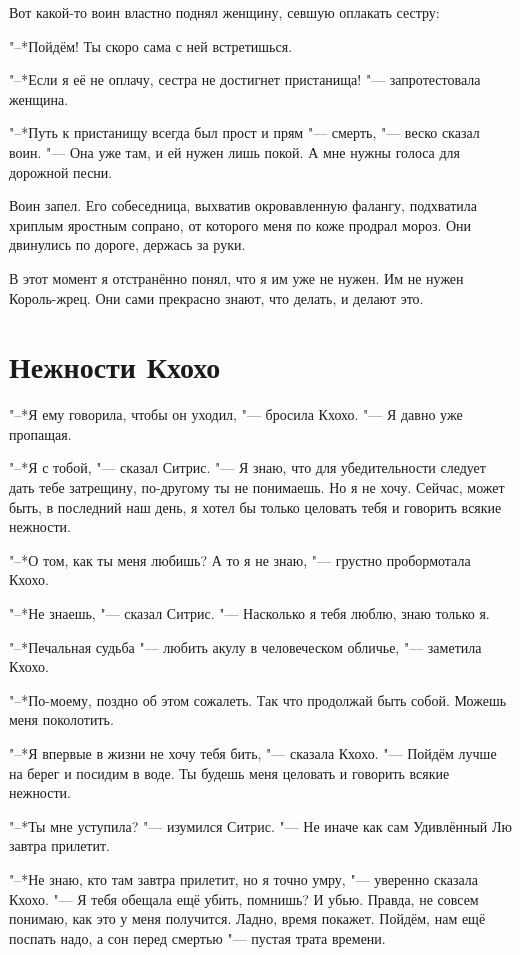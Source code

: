 \documentclass[a4paper,10pt,fleqn]{book}
\begin{document}
Вот какой-то воин властно поднял женщину, севшую оплакать сестру:

"--*Пойдём!
Ты скоро сама с ней встретишься.

"--*Если я её не оплачу, сестра не достигнет пристанища! "--- запротестовала женщина.

"--*Путь к пристанищу всегда был прост и прям "--- смерть, "--- веско сказал воин.
"--- Она уже там, и ей нужен лишь покой.
А мне нужны голоса для дорожной песни.

Воин запел.
Его собеседница, выхватив окровавленную фалангу, подхватила хриплым яростным сопрано, от которого меня по коже продрал мороз.
Они двинулись по дороге, держась за руки.

В этот момент я отстранённо понял, что я им уже не нужен.
Им не нужен Король-жрец.
Они сами прекрасно знают, что делать, и делают это.

\section{Нежности Кхохо}

"--*Я ему говорила, чтобы он уходил, "--- бросила Кхохо.
"--- Я давно уже пропащая.

"--*Я с тобой, "--- сказал Ситрис.
"--- Я знаю, что для убедительности следует дать тебе затрещину, по-другому ты не понимаешь.
Но я не хочу.
Сейчас, может быть, в последний наш день, я хотел бы только целовать тебя и говорить всякие нежности.

"--*О том, как ты меня любишь?
А то я не знаю, "--- грустно пробормотала Кхохо.

"--*Не знаешь, "--- сказал Ситрис.
"--- Насколько я тебя люблю, знаю только я.

"--*Печальная судьба "--- любить акулу в человеческом обличье, "--- заметила Кхохо.

"--*По-моему, поздно об этом сожалеть.
Так что продолжай быть собой.
Можешь меня поколотить.

"--*Я впервые в жизни не хочу тебя бить, "--- сказала Кхохо.
"--- Пойдём лучше на берег и посидим в воде.
Ты будешь меня целовать и говорить всякие нежности.

"--*Ты мне уступила? "--- изумился Ситрис.
"--- Не иначе как сам Удивлённый Лю завтра прилетит.

"--*Не знаю, кто там завтра прилетит, но я точно умру, "--- уверенно сказала Кхохо.
"--- Я тебя обещала ещё убить, помнишь?
И убью.
Правда, не совсем понимаю, как это у меня получится.
Ладно, время покажет.
Пойдём, нам ещё поспать надо, а сон перед смертью "--- пустая трата времени.
\end{document}
